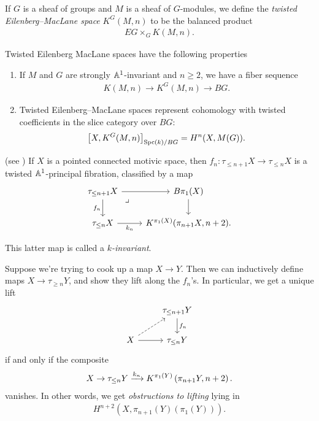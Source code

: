 \documentclass[11pt,openany]{book}
\begin{document}
\begin{definition} \cite[B.2]{Morel}
If $G$ is a sheaf of groups and $M$ is a sheaf of $G$-modules, we define the \textit{twisted Eilenberg--MacLane space} $K^G(M,n)$ to be the balanced product
\begin{align*}
    EG \times_G K(M,n).
\end{align*}
\end{definition}

\begin{proposition} Twisted Eilenberg MacLane spaces have the following properties
\begin{enumerate}
    \item If $M$ and $G$ are strongly $\mathbb{A}^1$-invariant and $n\ge 2$, we have a fiber sequence \cite[4.17]{ABH-nilpotent}
    \begin{align*}
        K(M,n) \to K^G(M,n) \to BG.
    \end{align*}
    
    \item Twisted Eilenberg--MacLane spaces represent cohomology with twisted coefficients in the slice category over $BG$:
    \begin{align*}
        \left[ X, K^G(M,n) \right]_{\mathrm{Spc}(k)/BG} = H^n(X,M(G)).
    \end{align*}
\end{enumerate}
\end{proposition}


\begin{proposition} (see \cite[6.1]{AF3}) If $X$ is a pointed connected motivic space, then $f_n \colon \tau_{\le n+1} X \to \tau_{\le n} X$ is a twisted $\mathbb{A}^1$-principal fibration, classified by a map
\[\begin{tikzcd}
    \tau_{\le n+1}X\rar\dar["f_n" left]\pb & B\pi_1(X)\dar\\
    \tau_{\le n} X\rar["k_n" below] & {K^{\pi_1(X)}(\pi_{n+1}X, n+2)}.
\end{tikzcd} \]
\end{proposition}
This latter map is called a $k$\textit{-invariant}.


\begin{example} Suppose we're trying to cook up a map $X \to Y$. Then we can inductively define maps $X \to \tau_{\ge n}Y$, and show they lift along the $f_n$'s. In particular, we get a unique lift
\[ \begin{tikzcd}
     & \tau_{\le n+1}Y\dar["f_n" right]\\
    X\rar\ar[ur,dashed] & \tau_{\le n}Y
\end{tikzcd} \]
if and only if the composite
\begin{align*}
    X \to \tau_{\le n}Y \xrightarrow{k_n} K^{\pi_1(Y)}\left( \pi_{n+1}Y, n+2 \right).
\end{align*}
vanishes. In other words, we get \textit{obstructions to lifting} lying in
\begin{align*}
    H^{n+2}(X, \pi_{n+1}(Y) \left( \pi_1(Y) \right)).
\end{align*}
\end{example}
\end{document}
